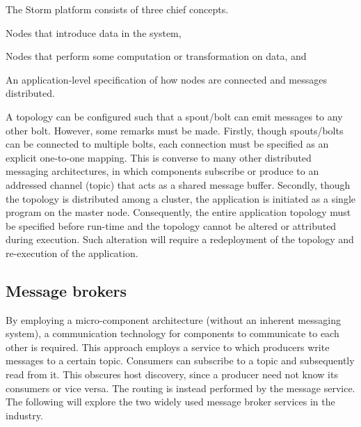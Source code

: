 The Storm platform consists of three chief concepts.
\begin{description}[style=nextline]
\nospace
\item[Spouts] Nodes that introduce data in the system,
\item[Bolts] Nodes that perform some computation or transformation on data, and
\item[Topology] An application-level specification of how nodes are connected and messages distributed.
\end{description}
A topology can be configured such that a spout/bolt can emit messages to any other bolt. However, some remarks must be made. Firstly, though spouts/bolts can be connected to multiple bolts, each connection must be specified as an explicit one-to-one mapping. This is converse to many other distributed messaging architectures, in which components subscribe or produce to an addressed channel (topic) that acts as a shared message buffer. Secondly, though the topology is distributed among a cluster, the application is initiated as a single program on the master node. Consequently, the entire application topology must be specified before run-time and the topology cannot be altered or attributed during execution. Such alteration will require a redeployment of the topology and re-execution of the application.

\subsection{Message brokers}
By employing a micro-component architecture (without an inherent messaging system), a communication technology for components to communicate to each other is required. This approach employs a service to which producers write messages to a certain topic. Consumers can subscribe to a topic and subsequently read from it. This obscures host discovery, since a producer need not know its consumers or vice versa. The routing is instead performed by the message service. The following will explore the two widely used message broker services in the industry.

